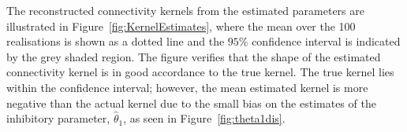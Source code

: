 \documentclass[10pt]{article}
\begin{document}
The reconstructed connectivity kernels from the estimated parameters are illustrated in Figure~\ref{fig:KernelEstimates}, where the mean over the 100 realisations is shown as a dotted line and the $95\%$ confidence interval is indicated by the grey shaded region. The figure verifies that the shape of the estimated connectivity kernel is in good accordance to the true kernel. The true kernel lies within the confidence interval; however, the mean estimated kernel is more negative than the actual kernel due to the small bias on the estimates of the inhibitory parameter, $\hat\theta_1$, as seen in Figure~\ref{fig:theta1dis}.
\end{document}
